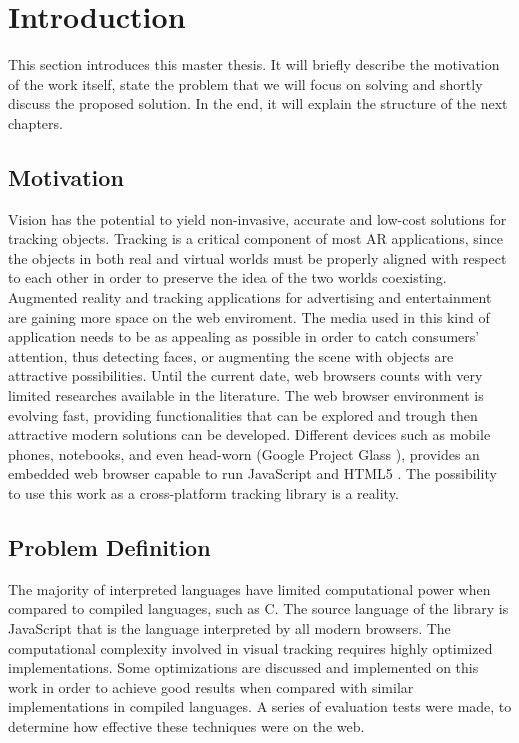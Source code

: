 \chapter{Introduction} %
\label{cha:introduction}

This section introduces this master thesis. It will briefly describe the motivation of the work itself, state the problem that we will focus on solving and shortly discuss the proposed solution. In the end, it will explain the structure of the next chapters.

\section{Motivation} %
\label{sec:introduction:motivation}

Vision has the potential to yield non-invasive, accurate and low-cost solutions for tracking objects. Tracking is a critical component of most AR applications, since the objects in both real and virtual worlds must be properly aligned with respect to each other in order to preserve the idea of the two worlds coexisting. Augmented reality and tracking applications for advertising and entertainment are gaining more space on the web enviroment. The media used in this kind of application needs to be as appealing as possible in order to catch consumers' attention, thus detecting faces, or augmenting the scene with objects are attractive possibilities. Until the current date, web browsers counts with very limited researches available in the literature. The web browser environment is evolving fast, providing functionalities that can be explored and trough then attractive modern solutions can be developed. Different devices such as mobile phones, notebooks, and even head-worn \cite{Benford1998} (Google Project Glass \cite{Glass2013}), provides an embedded web browser capable to run JavaScript and HTML5 \cite{International2009,Hickson2013}. The possibility to use this work as a cross-platform tracking library is a reality.


\section{Problem Definition} %
\label{sec:introduction:problem_definition}

The majority of interpreted languages have limited computational power when compared to compiled languages, such as C. The source language of the library is JavaScript \cite{International2009} that is the language interpreted by all modern browsers. The computational complexity involved in visual tracking requires highly optimized implementations. Some optimizations are discussed and implemented on this work in order to achieve good results when compared with similar implementations in compiled languages. A series of evaluation tests were made, to determine how effective these techniques were on the web.

